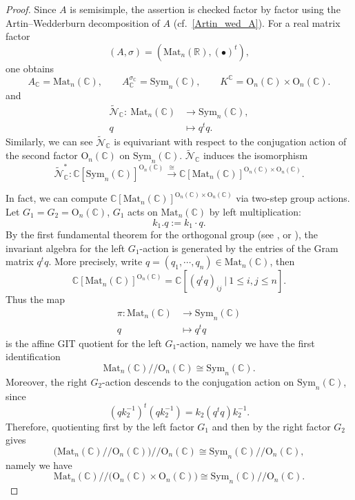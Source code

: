 \documentclass[oneside,11pt]{amsart}
\theoremstyle{definition}
\theoremstyle{remark}
\numberwithin{thm}{section}
\numberwithin{equation}{section}
\begin{document}
\begin{proof}
Since $A$ is semisimple, the assertion is checked factor by factor using the Artin--Wedderburn decomposition of $A$ (cf.~\eqref{Artin_wed_A}). For a real matrix factor
\[
(A,\sigma)=({\mathrm{Mat}}_n(\mathbb R),(\bullet)^t),
\]
one obtains
\[
A_{\mathbb{C}}={\mathrm{Mat}}_n(\mathbb{C}),\qquad A_{\mathbb{C}}^{\sigma_{\mathbb{C}}}={\mathrm{Sym}}_n(\mathbb{C}),\qquad K^{\mathbb{C}}=\mathrm{O}_n(\mathbb{C})\times \mathrm{O}_n(\mathbb{C}).
\]
and 
\begin{align*}
    \tilde{\mathcal{N}}_{\mathbb{C}}:\ {\mathrm{Mat}}_n(\mathbb{C})&\longrightarrow{\mathrm{Sym}}_n(\mathbb{C}),\\
    q&\longmapsto q^tq.
\end{align*}
Similarly, we can see $\tilde{\mathcal{N}}_{\mathbb{C}}$ is equivariant with respect to the conjugation action of the second factor $\mathrm{O}_n(\mathbb{C})$ on ${\mathrm{Sym}}_n(\mathbb{C})$. $ \tilde{\mathcal{N}}_{\mathbb{C}}$ induces the isomorphism
\[
 \tilde{\mathcal{N}}_{\mathbb{C}}^*: \mathbb{C}[{\mathrm{Sym}}_n(\mathbb{C})]^{{\mathrm O}_n(\mathbb{C})}\xrightarrow{\cong}\mathbb{C}[{\mathrm{Mat}}_n(\mathbb{C})]^{{\mathrm O}_n(\mathbb{C})\times {\mathrm O}_n(\mathbb{C})}.
\]

In fact, we can compute $\mathbb{C}[{\mathrm{Mat}}_n(\mathbb{C})]^{{\mathrm O}_n(\mathbb{C})\times {\mathrm O}_n(\mathbb{C})}$ via two-step group actions. Let $G_1=G_2=\mathrm{O}_n(\mathbb{C})$, $G_1$ acts on $\mathrm{Mat}_n(\mathbb{C})$ by left multiplication:
\[
k_1.q:=k_1\cdot q.
\]
By the first fundamental theorem for the orthogonal group (see \cite[Proposition 10.2]{KP96}, or \cite[Corollary 5.2.5]{GW09}), the invariant algebra for the left $G_1$-action is generated by the entries of the Gram matrix $q^tq$. More precisely, write $q=(q_1,\cdots,q_n)\in\mathrm{Mat}_n(\mathbb{C})$, then
\[
\mathbb{C}[{\mathrm{Mat}}_n(\mathbb{C})]^{{\mathrm O}_n(\mathbb{C})}=\mathbb{C}[(q^tq)_{ij}\ |\ 1\leq i,j\leq n].
\]
Thus the map
\begin{align*}
    \pi: {\mathrm{Mat}}_n(\mathbb{C})&\longrightarrow{\mathrm{Sym}}_n(\mathbb{C})\\
    q&\longmapsto q^tq
\end{align*}
is the affine GIT quotient for the left $G_1$-action, namely we have the first identification
\[
{\mathrm{Mat}}_n(\mathbb{C})/\!\!/{\mathrm O}_n(\mathbb{C})\cong{\mathrm{Sym}}_n(\mathbb{C}).
\]
Moreover, the right $G_2$-action descends to the conjugation action on ${\mathrm{Sym}}_n(\mathbb{C})$, since
\[
(qk_2^{-1})^t(qk_2^{-1})=k_2(q^tq)k_2^{-1}.
\]
Therefore, quotienting first by the left factor $G_1$ and then by the right factor $G_2$ gives
\[
\bigl({\mathrm{Mat}}_n(\mathbb{C})/\!\!/{\mathrm O}_n(\mathbb{C})\bigr)/\!\!/{\mathrm O}_n(\mathbb{C})\cong {\mathrm{Sym}}_n(\mathbb{C})/\!\!/{\mathrm O}_n(\mathbb{C}), 
\]
namely we have
\[
{\mathrm{Mat}}_n(\mathbb{C})/\!\!/\bigl({\mathrm O}_n(\mathbb{C})\times {\mathrm O}_n(\mathbb{C})\bigr)\cong{\mathrm{Sym}}_n(\mathbb{C})/\!\!/{\mathrm O}_n(\mathbb{C}).
\]


\end{proof}
\end{document}
